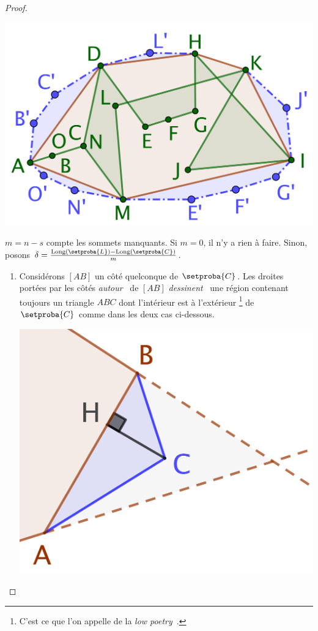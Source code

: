 \begin{proof}
	\begin{center}
		\includegraphics[scale=.45]{content/polygon/at-least-one/convex-hull-distortion.png}
	\end{center}


	$m = n - s$ compte les sommets manquants.
	Si $m = 0$, il n'y a rien à faire.
	Sinon, posons $\delta = \frac{\perim{\setproba{L}} - \perim{\setproba{C}}}{m}$.
	\begin{enumerate}
		\item \label{add-vertex-start}
		Considérons $[AB]$ un côté quelconque de $\setproba{C}$.
		Les droites portées par les côtés \og \emph{autour} \fg\ de $[AB]$ \og \emph{dessinent} \fg\ une région contenant toujours un triangle $ABC$ dont l'intérieur est à l'extérieur
		\footnote{
			C'est ce que l'on appelle de la \og \emph{low poetry} \fg\,.
		}
		de $\setproba{C}$ comme dans les deux cas ci-dessous.
		\begin{multicols}{2}
			\centering

			\includegraphics[scale=.35]{content/polygon/at-least-one/add-vertex-1.png}


\end{multicols}
\end{enumerate}
\end{proof}
